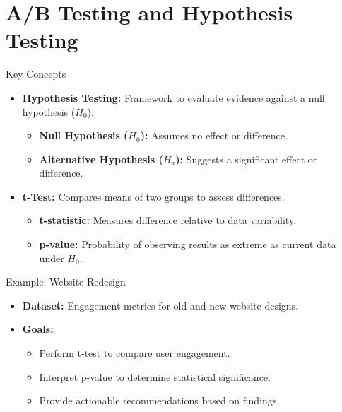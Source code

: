 \documentclass{beamer}
\begin{document}
\section{A/B Testing and Hypothesis Testing}
\begin{frame}{Key Concepts}
\begin{itemize}
    \item \textbf{Hypothesis Testing:} Framework to evaluate evidence against a null hypothesis ($H_0$).
    \begin{itemize}
        \item \textbf{Null Hypothesis ($H_0$):} Assumes no effect or difference.
        \item \textbf{Alternative Hypothesis ($H_a$):} Suggests a significant effect or difference.
    \end{itemize}
    \item \textbf{t-Test:} Compares means of two groups to assess differences.
    \begin{itemize}
        \item \textbf{t-statistic:} Measures difference relative to data variability.
        \item \textbf{p-value:} Probability of observing results as extreme as current data under $H_0$.
    \end{itemize}
\end{itemize}
\end{frame}

\begin{frame}{Example: Website Redesign}
\begin{itemize}
    \item \textbf{Dataset:} Engagement metrics for old and new website designs.
    \item \textbf{Goals:}
    \begin{itemize}
        \item Perform t-test to compare user engagement.
        \item Interpret p-value to determine statistical significance.
        \item Provide actionable recommendations based on findings.
    \end{itemize}
\end{itemize}
\end{frame}
\end{document}
